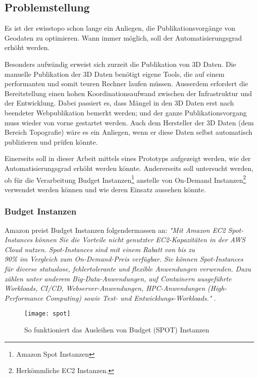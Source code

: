 \subsection{Problemstellung}
Es ist der swisstopo schon lange ein Anliegen, die Publikationsvorgänge von Geodaten zu optimieren. Wann immer möglich, soll der Automatisierungsgrad erhöht werden.

Besonders aufwändig erweist sich zurzeit die Publikation von 3D Daten. Die manuelle Publikation
der 3D Daten benötigt eigene Tools, die auf einem performanten und somit teuren Rechner laufen
müssen. Ausserdem erfordert die Bereitstellung einen hohen Koordinationsaufwand zwischen der
Infrastruktur und der Entwicklung. Dabei passiert es, dass Mängel in den 3D Daten erst nach
beendeter Webpublikation bemerkt werden; und der ganze Publikationsvorgang muss wieder von
vorne gestartet werden.
Auch dem Hersteller der 3D Daten (dem Bereich Topografie) wäre es ein Anliegen, wenn er diese
Daten selbst automatisch publizieren und prüfen könnte.

Einerseits soll in dieser Arbeit mittels eines Prototyps aufgezeigt werden, wie der Automatisierungsgrad erhöht werden könnte. Andererseits soll untersucht werden, ob für die Verarbeitung Budget Instanzen\footnote{Amazon Spot Instanzen} anstelle von On-Demand Instanzen\footnote{Herkömmliche EC2 Instanzen.} verwendet werden können und wie deren Einsatz aussehen könnte.

\subsubsection{Budget Instanzen}\label{kap:bugdet_instanzen}
Amazon preist Budget Instanzen folgendermassen an: \textit{"Mit Amazon EC2 Spot-Instances können Sie die Vorteile nicht genutzter EC2-Kapazitäten in der AWS Cloud nutzen. Spot-Instances sind mit einem Rabatt von bis zu\\ 90\% im Vergleich zum On-Demand-Preis verfügbar. Sie können Spot-Instances für diverse statuslose, fehlertolerante und flexible Anwendungen verwenden. Dazu zählen unter anderem Big-Data-Anwendungen, auf Containern ausgeführte Workloads, CI/CD, Webserver-Anwendungen, HPC-Anwendungen (High-Performance Computing) sowie Test- und Entwicklungs-Workloads."} \cite{AmazonAWSSpot:1}.


\begin{figure}[H]
	\centering
	\texttt{[image: spot]}
	\caption{So funktioniert das Ausleihen von Budget (SPOT) Instanzen}
	\label{fig:spot}
\end{figure}

